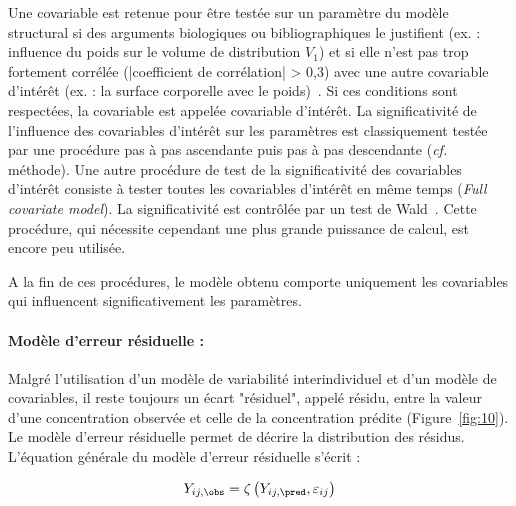 Une covariable est retenue pour être testée sur un paramètre du modèle structural si des arguments biologiques ou bibliographiques le justifient (ex. : influence du poids sur le volume de distribution $V_1$) et si elle n'est pas trop fortement corrélée (|coefficient de corrélation| > 0,3) avec une autre covariable d'intérêt (ex. : la surface corporelle avec le poids)~\citep{REF11}. Si ces conditions sont respectées, la covariable est appelée covariable d'intérêt. La significativité de l'influence des covariables d'intérêt sur les paramètres est classiquement testée par une procédure pas à pas ascendante puis pas à pas descendante (\textit{cf.} méthode). Une autre procédure de test de la significativité des covariables d'intérêt consiste à tester toutes les covariables d'intérêt en même temps (\textit{Full covariate model}). La significativité est contrôlée par un test de Wald~\citep{REF12}. Cette procédure, qui nécessite cependant une plus grande puissance de calcul, est encore peu utilisée.

A la fin de ces procédures, le modèle obtenu comporte uniquement les covariables qui influencent significativement les paramètres.

\paragraph*{Modèle d'erreur résiduelle :} Malgré l'utilisation d'un modèle de variabilité interindividuel et d'un modèle de covariables, il reste toujours un écart "résiduel", appelé résidu, entre la valeur d'une concentration observée et celle de la concentration prédite (Figure~\ref{fig:10}). Le modèle d'erreur résiduelle permet de décrire la distribution des résidus. L'équation générale du modèle d'erreur résiduelle s'écrit :

\begin{equation}
Y_{ij,\obs} = \zeta \left( Y_{ij,\pred}, \varepsilon_{ij} \right)
\label{eq:49}
\end{equation}

